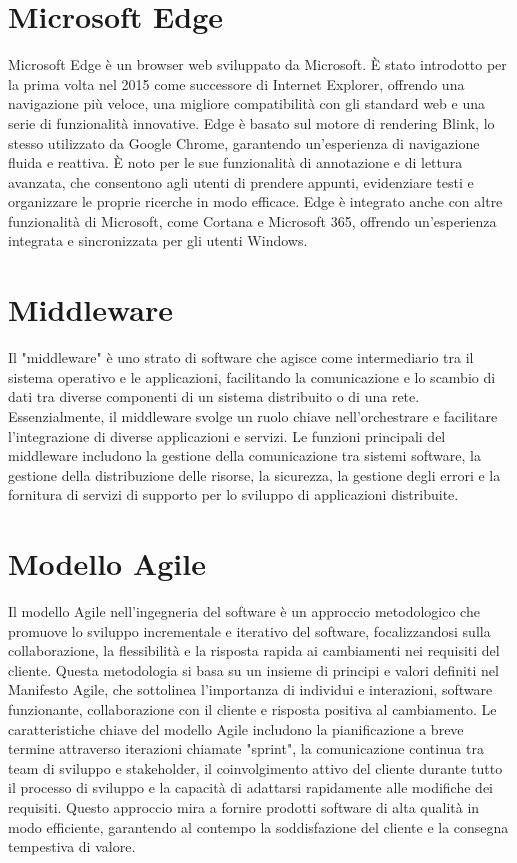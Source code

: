\documentclass{article}
\begin{document}
\section{Microsoft Edge}
Microsoft Edge è un browser web sviluppato da Microsoft. È stato introdotto per la prima volta nel 2015 come successore di Internet Explorer, offrendo una navigazione più veloce, una migliore compatibilità con gli standard web e una serie di funzionalità innovative. Edge è basato sul motore di rendering Blink, lo stesso utilizzato da Google Chrome, garantendo un'esperienza di navigazione fluida e reattiva. È noto per le sue funzionalità di annotazione e di lettura avanzata, che consentono agli utenti di prendere appunti, evidenziare testi e organizzare le proprie ricerche in modo efficace. Edge è integrato anche con altre funzionalità di Microsoft, come Cortana e Microsoft 365, offrendo un'esperienza integrata e sincronizzata per gli utenti Windows.

\section{Middleware}
Il "middleware" è uno strato di software che agisce come intermediario tra il sistema operativo e le applicazioni, facilitando la comunicazione e lo scambio di dati tra diverse componenti di un sistema distribuito o di una rete. Essenzialmente, il middleware svolge un ruolo chiave nell'orchestrare e facilitare l'integrazione di diverse applicazioni e servizi. Le funzioni principali del middleware includono la gestione della comunicazione tra sistemi software, la gestione della distribuzione delle risorse, la sicurezza, la gestione degli errori e la fornitura di servizi di supporto per lo sviluppo di applicazioni distribuite.

\section{Modello Agile}
Il modello Agile nell'ingegneria del software è un approccio metodologico che promuove lo sviluppo incrementale e iterativo del software, focalizzandosi sulla collaborazione, la flessibilità e la risposta rapida ai cambiamenti nei requisiti del cliente. Questa metodologia si basa su un insieme di principi e valori definiti nel Manifesto Agile, che sottolinea l'importanza di individui e interazioni, software funzionante, collaborazione con il cliente e risposta positiva al cambiamento. Le caratteristiche chiave del modello Agile includono la pianificazione a breve termine attraverso iterazioni chiamate "sprint", la comunicazione continua tra team di sviluppo e stakeholder, il coinvolgimento attivo del cliente durante tutto il processo di sviluppo e la capacità di adattarsi rapidamente alle modifiche dei requisiti. Questo approccio mira a fornire prodotti software di alta qualità in modo efficiente, garantendo al contempo la soddisfazione del cliente e la consegna tempestiva di valore.
\end{document}
